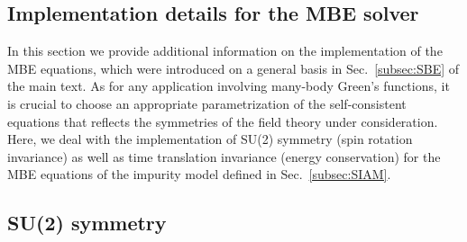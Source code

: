 \documentclass{SciPost}
\begin{document}
\begin{appendix}
\section{Implementation details for the MBE solver}
\label{app:MBEdetails}

In this section we provide additional information on the implementation of the MBE equations, which were introduced on a general basis in Sec.~\ref{subsec:SBE} of the main text. As for any application involving many-body Green's functions, it is crucial to choose an appropriate parametrization of the self-consistent equations that reflects the symmetries of the field theory under consideration. Here, we deal with the implementation of SU(2) symmetry (spin rotation invariance) as well as time translation invariance (energy conservation) for the MBE equations of the impurity model defined in Sec.~\ref{subsec:SIAM}.

\subsection{SU(2) symmetry}


\end{appendix}
\end{document}
